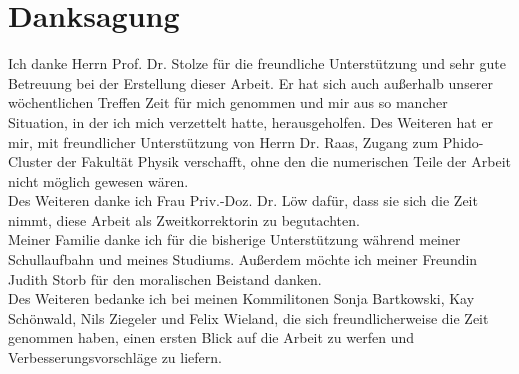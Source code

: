 \chapter*{Danksagung}
Ich danke Herrn Prof. Dr. Stolze für die freundliche Unterstützung und sehr gute Betreuung bei der Erstellung dieser Arbeit. Er hat sich auch außerhalb unserer wöchentlichen Treffen Zeit für mich genommen und mir aus so mancher Situation, in der ich mich verzettelt hatte, herausgeholfen. Des Weiteren hat er mir, mit freundlicher Unterstützung von Herrn Dr. Raas, Zugang zum Phido-Cluster der Fakultät Physik verschafft, ohne den die numerischen Teile der Arbeit nicht möglich gewesen wären.\\
Des Weiteren danke ich Frau Priv.-Doz. Dr. Löw dafür, dass sie sich die Zeit nimmt, diese Arbeit als Zweitkorrektorin zu begutachten. \\
Meiner Familie danke ich für die bisherige Unterstützung während meiner Schullaufbahn und meines Studiums. Außerdem möchte ich meiner Freundin Judith Storb für den moralischen Beistand danken. \\
Des Weiteren bedanke ich bei meinen Kommilitonen Sonja Bartkowski, Kay Schönwald, Nils Ziegeler und Felix Wieland, die sich freundlicherweise die Zeit genommen haben, einen ersten Blick auf die Arbeit zu werfen und Verbesserungsvorschläge zu liefern.
\thispagestyle{empty}
